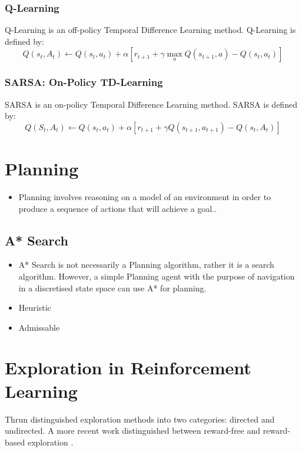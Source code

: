 \subsubsection{Q-Learning}
Q-Learning \cite{Watkins:1989, journals/ml/WatkinsD92} is an off-policy Temporal Difference Learning method. Q-Learning is defined by:
$$Q(s_t,A_t) \leftarrow Q(s_t,a_t) + \alpha[r_{t+1} + \gamma \max_aQ(s_{t+1}, a) -Q(s_t,a_t)]$$
\subsubsection{SARSA: On-Policy TD-Learning}
SARSA \cite{rummery:cuedtr94, conf/nips/Sutton95} is an on-policy Temporal Difference Learning method. SARSA is defined by:
$$Q(S_t,A_t) \leftarrow Q(s_t,a_t) + \alpha[r_{t+1} + \gamma Q(s_{t+1}, a_{t+1})-Q(s_t,A_t)]$$
\section{Planning}
\begin{itemize}
    \item Planning involves reasoning on a model of an environment in order to produce a sequence of actions that will achieve a goal.\cite{russelNorvig2003:aima}.
\end{itemize}
\subsection{A* Search}
\begin{itemize}
    \item A* Search \cite{4082128} is not necessarily a Planning algorithm, rather it is a search algorithm. However, a simple Planning agent with the purpose of navigation in a discretised state space can use A* for planning.
    \item Heuristic
    \item Admissable
\end{itemize}
\section{Exploration in Reinforcement Learning}
Thrun \cite{Thrun-1992-15850} distinguished exploration methods into two categories: directed and undirected. A more recent work distinguished between reward-free and reward-based exploration \cite{DBLP:journals/corr/abs-2109-00157}.
